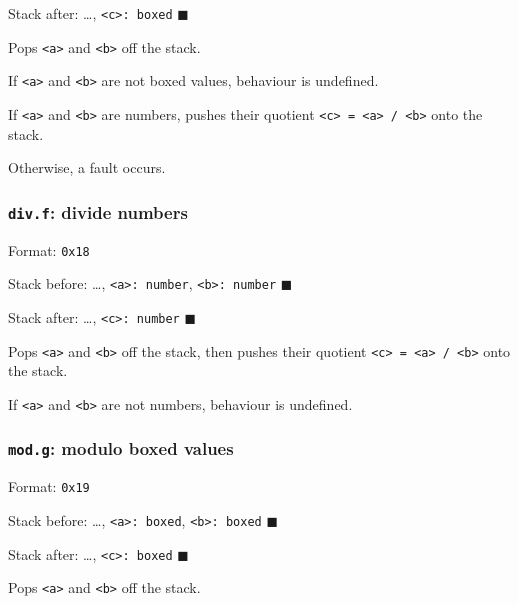 Stack after: \ldots, \texttt{\textless{}c\textgreater{}:\ boxed}
\(\blacksquare\)

Pops \texttt{\textless{}a\textgreater{}} and
\texttt{\textless{}b\textgreater{}} off the stack.

If \texttt{\textless{}a\textgreater{}} and
\texttt{\textless{}b\textgreater{}} are not boxed values, behaviour is
undefined.

If \texttt{\textless{}a\textgreater{}} and
\texttt{\textless{}b\textgreater{}} are numbers, pushes their quotient
\texttt{\textless{}c\textgreater{}\ =\ \textless{}a\textgreater{}\ /\ \textless{}b\textgreater{}}
onto the stack.

Otherwise, a fault occurs.

\subsubsection{\texorpdfstring{\texttt{div.f}: divide
numbers}{div.f: divide numbers}}

Format: \texttt{0x18}

Stack before: \ldots, \texttt{\textless{}a\textgreater{}:\ number},
\texttt{\textless{}b\textgreater{}:\ number} \(\blacksquare\)

Stack after: \ldots, \texttt{\textless{}c\textgreater{}:\ number}
\(\blacksquare\)

Pops \texttt{\textless{}a\textgreater{}} and
\texttt{\textless{}b\textgreater{}} off the stack, then pushes their
quotient
\texttt{\textless{}c\textgreater{}\ =\ \textless{}a\textgreater{}\ /\ \textless{}b\textgreater{}}
onto the stack.

If \texttt{\textless{}a\textgreater{}} and
\texttt{\textless{}b\textgreater{}} are not numbers, behaviour is
undefined.

\subsubsection{\texorpdfstring{\texttt{mod.g}: modulo boxed
values}{mod.g: modulo boxed values}}

Format: \texttt{0x19}

Stack before: \ldots, \texttt{\textless{}a\textgreater{}:\ boxed},
\texttt{\textless{}b\textgreater{}:\ boxed} \(\blacksquare\)

Stack after: \ldots, \texttt{\textless{}c\textgreater{}:\ boxed}
\(\blacksquare\)

Pops \texttt{\textless{}a\textgreater{}} and
\texttt{\textless{}b\textgreater{}} off the stack.

